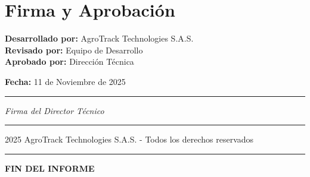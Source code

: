 \documentclass[12pt,a4paper]{article}
\begin{document}

\section*{Firma y Aprobación}

\vspace{1cm}

\noindent
\textbf{Desarrollado por:} AgroTrack Technologies S.A.S. \\
\textbf{Revisado por:} Equipo de Desarrollo \\
\textbf{Aprobado por:} Dirección Técnica \\

\vspace{1cm}

\noindent
\textbf{Fecha:} 11 de Noviembre de 2025

\vspace{2cm}

\begin{center}
\rule{6cm}{0.4pt}

\textit{Firma del Director Técnico}
\end{center}

\vspace{2cm}

\begin{center}
\hrule
\vspace{0.3cm}
\textcopyright{} 2025 AgroTrack Technologies S.A.S. - Todos los derechos reservados
\vspace{0.3cm}
\hrule
\end{center}

\vfill

\begin{center}
\Large\textbf{FIN DEL INFORME}
\end{center}
\end{document}
